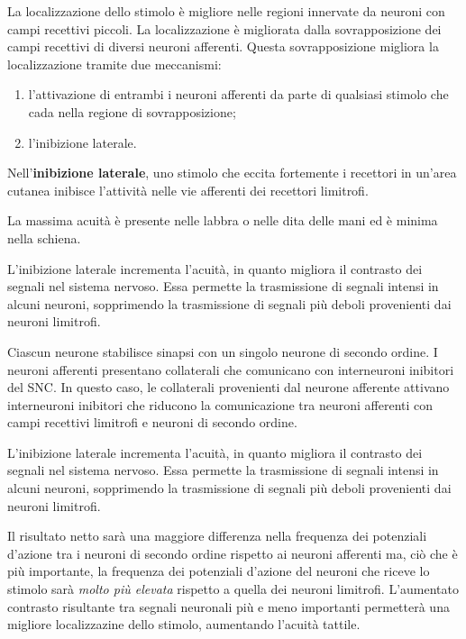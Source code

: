 \documentclass[]{article}
\begin{document}
La localizzazione dello stimolo è migliore nelle regioni innervate da
neuroni con campi recettivi piccoli. La localizzazione è migliorata
dalla sovrapposizione dei campi recettivi di diversi neuroni afferenti.
Questa sovrapposizione migliora la localizzazione tramite due
meccanismi:

\begin{enumerate}
\def\labelenumi{\arabic{enumi}.}
\itemsep1pt\parskip0pt
\item
  l'attivazione di entrambi i neuroni afferenti da parte di qualsiasi
  stimolo che cada nella regione di sovrapposizione;
\item
  l'inibizione laterale.
\end{enumerate}

Nell'\textbf{inibizione laterale}, uno stimolo che eccita fortemente i
recettori in un'area cutanea inibisce l'attività nelle vie afferenti dei
recettori limitrofi.

La massima acuità è presente nelle labbra o nelle dita delle mani ed è
minima nella schiena.

L'inibizione laterale incrementa l'acuità, in quanto migliora il
contrasto dei segnali nel sistema nervoso. Essa permette la trasmissione
di segnali intensi in alcuni neuroni, sopprimendo la trasmissione di
segnali più deboli provenienti dai neuroni limitrofi.

Ciascun neurone stabilisce sinapsi con un singolo neurone di secondo
ordine. I neuroni afferenti presentano collaterali che comunicano con
interneuroni inibitori del SNC. In questo caso, le collaterali
provenienti dal neurone afferente attivano interneuroni inibitori che
riducono la comunicazione tra neuroni afferenti con campi recettivi
limitrofi e neuroni di secondo ordine.

L'inibizione laterale incrementa l'acuità, in quanto migliora il
contrasto dei segnali nel sistema nervoso. Essa permette la trasmissione
di segnali intensi in alcuni neuroni, sopprimendo la trasmissione di
segnali più deboli provenienti dai neuroni limitrofi.

Il risultato netto sarà una maggiore differenza nella frequenza dei
potenziali d'azione tra i neuroni di secondo ordine rispetto ai neuroni
afferenti ma, ciò che è più importante, la frequenza dei potenziali
d'azione del neuroni che riceve lo stimolo sarà \emph{molto più elevata}
rispetto a quella dei neuroni limitrofi. L'aumentato contrasto
risultante tra segnali neuronali più e meno importanti permetterà una
migliore localizzazine dello stimolo, aumentando l'acuità tattile.
\end{document}
